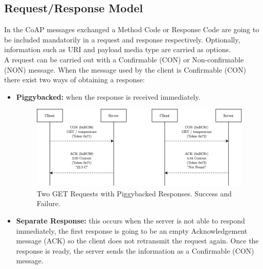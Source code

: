 \documentclass[11pt]{book}
\begin{document}
\subsection{Request/Response Model}
In the CoAP messages exchanged a Method Code or Response Code are going to be included mandatorily in a request and response respectively. Optionally, information such as URI and payload media type are carried as options. \\
A request can be carried out with a Confirmable (CON) or Non-confirmable (NON) message. When the message used by the client is Confirmable (CON) there exist two ways of obtaining a response:
\begin{itemize}
\item \textbf{Piggybacked:} when the response is received immediately.
\begin{figure}[H]
	\centering
	\includegraphics [scale=0.175] {request-response.png}
	\caption{Two GET Requests with Piggybacked Responses. Success and Failure.}
\end{figure}
\item \textbf{Separate Response:} this occurs when the server is not able to respond immediately, the first response is going to be an empty Acknowledgement message (ACK) so the client does not retransmit the request again. Once the response is ready, the server sends the information as a Confirmable (CON) message.
\begin{figure}[H]
	\centering

\end{figure}
\end{itemize}
\end{document}
